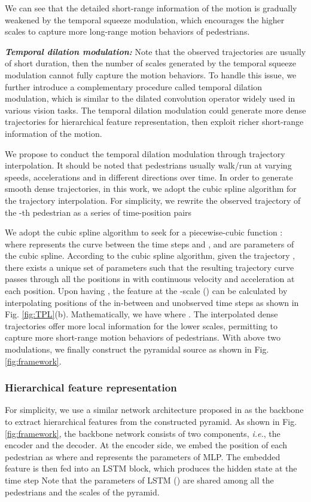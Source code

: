 \documentclass[letterpaper]{article} \usepackage{aaai21}  \usepackage{times}  \usepackage{helvet} \usepackage{courier}  \usepackage[hyphens]{url}  \usepackage{graphicx} \urlstyle{rm} \def\UrlFont{\rm}  \usepackage{natbib}  \usepackage{caption} \frenchspacing  \setlength{\pdfpagewidth}{8.5in}  \setlength{\pdfpageheight}{11in}
\begin{document}
We can see that the detailed short-range information of the motion is gradually weakened by the temporal squeeze modulation,  which encourages the higher scales to capture more long-range motion behaviors of pedestrians. 


\noindent\textit{\textbf{Temporal dilation modulation:}}
Note that the observed trajectories are usually of short duration, then the number of scales generated by the temporal squeeze modulation cannot fully capture the motion behaviors. To handle this issue, we further introduce a complementary procedure called temporal dilation modulation, which is similar to the dilated convolution operator widely used in various vision tasks.
The temporal dilation modulation could generate more dense trajectories for hierarchical feature representation, then exploit richer short-range information of the motion.

We propose to conduct the temporal dilation modulation through trajectory interpolation. It should be noted that pedestrians usually walk/run at varying speeds, accelerations and in different directions over time. In order to generate smooth dense trajectories, in this work, we adopt the cubic spline algorithm for the trajectory interpolation. For simplicity, we rewrite the observed trajectory of the -th pedestrian as a series of time-position pairs

We adopt the cubic spline algorithm to seek for a piecewise-cubic function : 
 where 
 represents the curve between the time steps  and , and  are parameters of the cubic spline. According to the cubic spline algorithm, given the trajectory , there exists a unique set of parameters  such that the resulting trajectory curve passes through all the positions in  with continuous velocity and acceleration at each position. 
Upon having , the feature  at the -scale () can be calculated by interpolating positions of the in-between and unobserved time steps as shown in Fig. \ref{fig:TPL}(b). Mathematically, we have
 where . The interpolated dense trajectories offer more local information for the lower scales, permitting to capture more short-range motion behaviors of pedestrians.  With above two modulations, we finally construct the pyramidal source as shown in Fig. \ref{fig:framework}.

\subsubsection{Hierarchical feature representation}
For simplicity, we use a similar network architecture proposed in \cite{gupta2018social} as the backbone to extract hierarchical features from the constructed pyramid. As shown in Fig. \ref{fig:framework}, the backbone network consists of two components, \textit{i.e.}, the encoder and the decoder. 
At the encoder side, we embed the position of each pedestrian as
 where  and  represents the parameters of MLP. The embedded feature  is then fed into an LSTM block, which produces the hidden state at the time step 
 Note that the parameters of LSTM () are shared among all the pedestrians and the scales of the pyramid.
\end{document}

